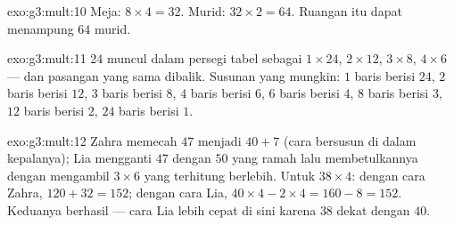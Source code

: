 \begin{solution}{exo:g3:mult:10}
Meja: $8 \times 4 = 32$. Murid: $32 \times 2 = 64$. Ruangan itu
dapat menampung $64$ murid.
\end{solution}

\begin{solution}{exo:g3:mult:11}
$24$ muncul dalam persegi tabel sebagai $1 \times 24$, $2 \times 12$,
$3 \times 8$, $4 \times 6$ --- dan pasangan yang sama dibalik.
Susunan yang mungkin: $1$ baris berisi $24$, $2$ baris berisi $12$,
$3$ baris berisi $8$, $4$ baris berisi $6$, $6$ baris berisi $4$,
$8$ baris berisi $3$, $12$ baris berisi $2$, $24$ baris berisi $1$.
\end{solution}

\begin{solution}{exo:g3:mult:12}
Zahra memecah $47$ menjadi $40 + 7$ (cara bersusun di dalam
kepalanya); Lia mengganti $47$ dengan $50$ yang ramah lalu
membetulkannya dengan mengambil $3 \times 6$ yang terhitung
berlebih. Untuk $38 \times 4$: dengan cara Zahra,
$120 + 32 = 152$; dengan cara Lia, $40 \times 4 - 2 \times 4 = 160 - 8 =
152$. Keduanya berhasil --- cara Lia lebih cepat di sini karena $38$
dekat dengan $40$.

\end{solution}
